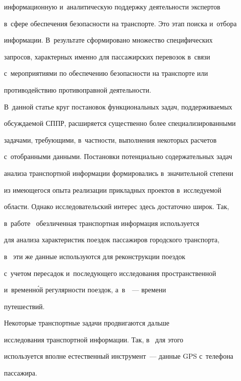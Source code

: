 информационную и~аналитическую поддержку деятельности экспертов 


в~сфере обеспечения безопас\-ности на транспорте. Это этап поиска и~отбора 


информации. В~результате сформировано множество специфических 


запросов, характерных именно для пассажирских перевозок в~связи 


с~мероприятиями по обеспечению безопасности на транспорте или 


противодействию противоправной дея\-тель\-ности.





В~данной статье круг постановок функциональных задач, под\-дер\-жи\-ва\-емых 


об\-суж\-да\-емой СППР, расширяется существенно более специализированными 


задачами, тре\-бу\-ющи\-ми, в~част\-ности, выполнения некоторых расчетов 


с~отобранными данными. Постановки потенциально содержательных задач 


анализа транспортной информации формировались в~значительной степени 


из имеющегося опыта реализации прикладных проектов в~исследуемой 


области. Однако исследовательский интерес здесь достаточно широк. Так, 


в~работе~\cite{3-bos} обезличенная транспортная информация ис\-поль\-зу\-ет\-ся 


для анализа характеристик поездок пассажиров городского транспорта, 


в~\cite{4-bos} эти же данные используются для реконструкции поездок 


с~учетом пересадок и~последующего исследования пространственной 


и~временн\'{о}й регулярности поездок, а~в~\cite{5-bos}~--- времени 


путе\-шест\-вий. 





Некоторые транспортные задачи продвигаются дальше 


исследования транспортной информации. Так, в~\cite{6-bos} для этого 


ис\-поль\-зу\-ет\-ся вполне естественный инструмент~--- данные GPS с~телефона 


пассажира.





